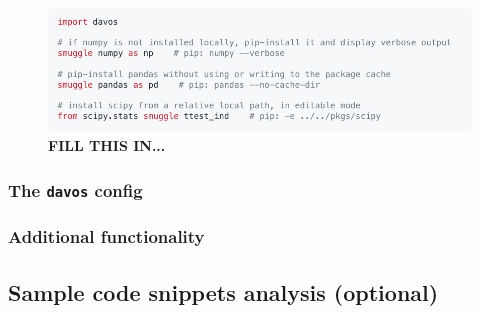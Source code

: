 \documentclass[preprint,12pt, a4paper]{elsarticle}
\begin{document}
\begin{figure}[h]
\centering
\includegraphics[width=\textwidth]{snippets/snippet1.pdf}
\caption{\small \textbf{FILL THIS IN...}}
\label{fig:snippet1}
\end{figure}



%
%
%
%
%

\subsubsection{The \texttt{davos} config}

\subsubsection{Additional functionality}



\subsection{Sample code snippets analysis (optional)}


\end{document}

